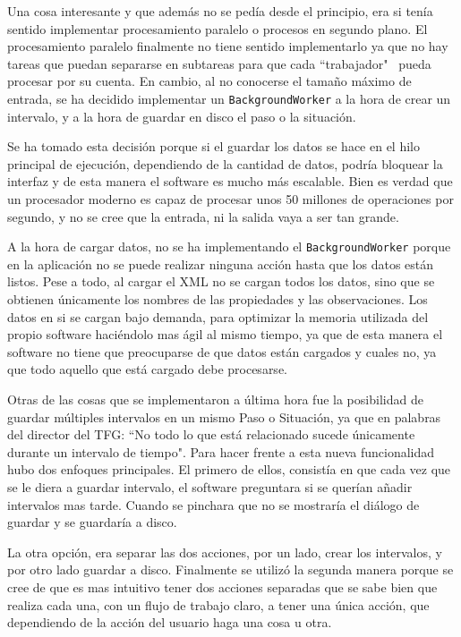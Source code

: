 Una cosa interesante y que adem\'as no se ped\'ia desde el principio, era si 
ten\'ia sentido implementar procesamiento paralelo o procesos en segundo plano. El 
procesamiento paralelo finalmente no tiene sentido implementarlo ya que no hay tareas
que puedan separarse en subtareas para que cada ``trabajador" \ pueda procesar por su
cuenta. En cambio, al no conocerse el tama\~no m\'aximo de entrada, se ha decidido
implementar un \texttt{BackgroundWorker} a la hora de crear un intervalo, y a la hora
de guardar en disco el paso o la situaci\'on.

Se ha tomado esta decisi\'on porque si el guardar los datos se hace en el hilo principal
de ejecuci\'on, dependiendo de la cantidad de datos, podr\'ia bloquear la interfaz y
de esta manera el software es mucho m\'as escalable. Bien es
verdad que un procesador moderno es capaz de procesar unos 50 millones de operaciones por
segundo, y no se cree que la entrada, ni la salida vaya a ser tan grande.

A la hora de cargar datos, no se ha implementando el \texttt{BackgroundWorker}
porque en la aplicaci\'on no se puede realizar ninguna acci\'on hasta que los datos est\'an 
listos. Pese a todo, al cargar el XML no se cargan todos los datos, sino que se obtienen \'unicamente
los nombres de las propiedades y las observaciones. Los datos en si se cargan bajo demanda, para optimizar la memoria
utilizada del propio software haci\'endolo mas \'agil al mismo tiempo, ya que de esta manera el software no
tiene que preocuparse de que datos est\'an cargados y cuales no, ya que todo aquello que est\'a cargado debe
procesarse.

Otras de las cosas que se implementaron a \'ultima hora fue la posibilidad de guardar m\'ultiples
intervalos en un mismo Paso o Situaci\'on, ya que en palabras del director del TFG: ``No todo lo que est\'a 
relacionado sucede \'unicamente durante un intervalo de tiempo". Para hacer frente a esta nueva funcionalidad
hubo dos enfoques principales. El primero de ellos, consist\'ia en que cada vez que se le diera a guardar
intervalo, el software preguntara si se quer\'ian a\~nadir intervalos mas tarde. Cuando se pinchara que no
se mostrar\'ia el di\'alogo de guardar y se guardar\'ia a disco.

La otra opci\'on, era separar las dos acciones, por un lado, crear los intervalos, y por otro lado guardar a disco.
Finalmente se utiliz\'o la segunda manera porque se cree de que es mas intuitivo tener dos acciones separadas
que se sabe bien que realiza cada una, con un flujo de trabajo claro, a tener una \'unica acci\'on, que dependiendo
de la acci\'on del usuario haga una cosa u otra. 


